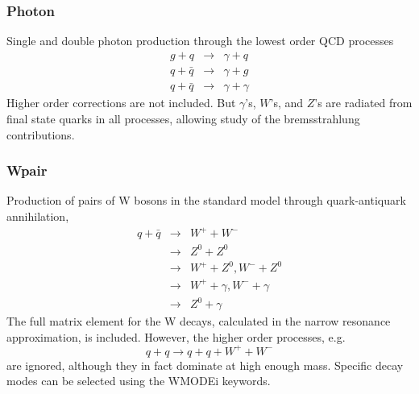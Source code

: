 \subsubsection{Photon} Single and double photon production through the
lowest order QCD processes
\begin{eqnarray*}
g + q &\to& \gamma + q \\
q + \bar q &\to& \gamma + g \\
q + \bar q &\to& \gamma + \gamma
\end{eqnarray*}
Higher order corrections are not included. But $\gamma$'s, $W$'s, and
$Z$'s are radiated from final state quarks in all processes, allowing
study of the bremsstrahlung contributions.

\subsubsection{Wpair} Production of pairs of W bosons in the standard
model through quark-antiquark annihilation,
\begin{eqnarray*}
q + \bar q &\to& W^+ + W^- \\
           &\to& Z^0 + Z^0 \\
           &\to& W^+ + Z^0, W^- + Z^0 \\
           &\to& W^+ + \gamma, W^- + \gamma \\
           &\to& Z^0 + \gamma
\end{eqnarray*}
The full matrix element for the W decays, calculated in the narrow
resonance approximation, is included. However, the higher order
processes, e.g.
$$
q + q \to q + q + W^+ + W^-
$$
are ignored, although they in fact dominate at high enough mass.
Specific decay modes can be selected using the WMODEi keywords.

